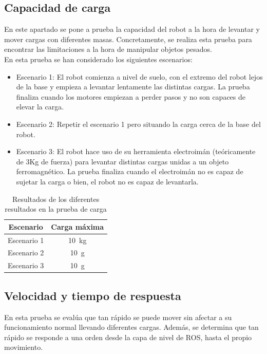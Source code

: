 \subsection{Capacidad de carga}
\noindent En este apartado se pone a prueba la capacidad del robot a la hora de levantar y mover cargas con diferentes masas. Concretamente, 
se realiza esta prueba para encontrar las limitaciones a la hora de manipular objetos pesados. \\
En esta prueba se han considerado los siguientes escenarios:
\begin{itemize}
    \item Escenario 1: El robot comienza a nivel de suelo, con el extremo del robot lejos de la base y empieza a levantar lentamente las distintas cargas. La 
    prueba finaliza cuando los motores empiezan a perder pasos y no son capaces de elevar la carga.
    \item Escenario 2: Repetir el escenario 1 pero situando la carga cerca de la base del robot.
    \item Escenario 3: El robot hace uso de su herramienta electroimán (teóricamente de 3Kg de fuerza) para levantar distintas cargas unidas a un 
    objeto ferromagnético. La prueba finaliza cuando el electroimán no es capaz de sujetar la carga o bien, el robot no es capaz de levantarla.
\end{itemize}
\begin{table}[H]
\begin{center}
\begin{tabular}{|c|c|}
\hline
\textbf{Escenario} & \textbf{Carga máxima} \\
\hline
Escenario 1& \SI{10}{\kilo\gram} \\
Escenario 2 & \SI{10}{\gram} \\
Escenario 3 & \SI{10}{\gram} \\
\hline
\end{tabular}
\caption{Resultados de los diferentes resultados en la prueba de carga}
\label{cuadro:evaluacion_carga}
\end{center}
\end{table}
\newpage
\subsection{Velocidad y tiempo de respuesta}
\noindent En esta prueba se evalúa que tan rápido se puede mover sin afectar a su funcionamiento normal 
llevando diferentes cargas. Además, se determina que tan rápido se responde a una orden desde la capa 
de nivel de ROS, hasta el propio movimiento.

